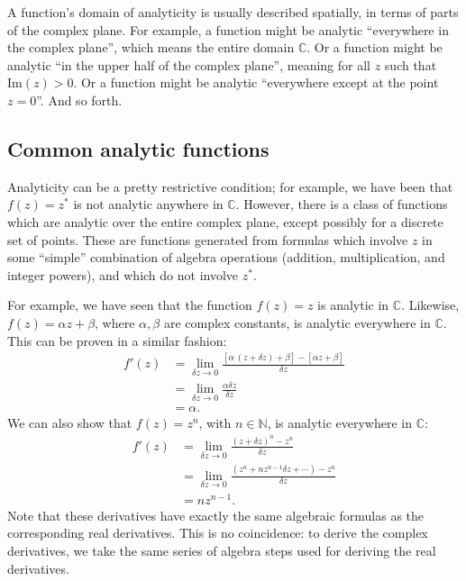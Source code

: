 \documentclass[10pt,a4paper]{article}
\begin{document}
A function's domain of analyticity is usually described spatially, in
terms of parts of the complex plane. For example, a function might be
analytic ``everywhere in the complex plane'', which means the entire
domain $\mathbb{C}$. Or a function might be analytic ``in the upper
half of the complex plane'', meaning for all $z$ such that
$\mathrm{Im}(z) > 0$. Or a function might be analytic ``everywhere
except at the point $z = 0$''. And so forth.

\subsection{Common analytic functions}
\label{common-analytic-functions}

Analyticity can be a pretty restrictive condition; for example, we
have been that $f(z) = z^*$ is not analytic anywhere in $\mathbb{C}$.
However, there is a class of functions which are analytic over the
entire complex plane, except possibly for a discrete set of points.
These are functions generated from formulas which involve $z$ in some
``simple'' combination of algebra operations (addition,
multiplication, and integer powers), and which do not involve $z^*$.

For example, we have seen that the function $f(z) = z$ is analytic in
$\mathbb{C}$. Likewise, $f(z) = \alpha z + \beta$, where $\alpha,
\beta$ are complex constants, is analytic everywhere in
$\mathbb{C}$. This can be proven in a similar fashion:
\begin{align}
  f'(z) &= \lim_{\delta z\rightarrow 0}
  \frac{[\alpha\,(z+\delta z) + \beta] - [\alpha z + \beta]}{\delta z} \\
  &= \lim_{\delta z\rightarrow 0} \frac{\alpha \delta z}{\delta z} \\
  &= \alpha.
\end{align}
We can also show that $f(z) = z^n$, with $n \in \mathbb{N}$, is
analytic everywhere in $\mathbb{C}$:
\begin{align}
  f'(z) &= \lim_{\delta z\rightarrow 0} \frac{(z+\delta z)^n - z^n}{\delta z} \\
  &= \lim_{\delta z\rightarrow 0}
  \frac{(z^n + n z^{n-1} \delta z + \cdots) - z^n}{\delta z} \\
  &= n z^{n-1}.
\end{align}
Note that these derivatives have exactly the same algebraic formulas as
the corresponding real derivatives. This is no coincidence: to derive
the complex derivatives, we take the same series of algebra steps used
for deriving the real derivatives.
\end{document}
